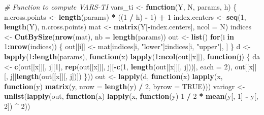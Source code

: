 \documentclass[11pt,]{article}
\newenvironment{Shaded}{\begin{snugshade}}{\end{snugshade}}
\newcommand{\CommentTok}[1]{\textcolor[rgb]{0.56,0.35,0.01}{\textit{#1}}}
\newcommand{\ControlFlowTok}[1]{\textcolor[rgb]{0.13,0.29,0.53}{\textbf{#1}}}
\newcommand{\DataTypeTok}[1]{\textcolor[rgb]{0.13,0.29,0.53}{#1}}
\newcommand{\DecValTok}[1]{\textcolor[rgb]{0.00,0.00,0.81}{#1}}
\newcommand{\KeywordTok}[1]{\textcolor[rgb]{0.13,0.29,0.53}{\textbf{#1}}}
\newcommand{\NormalTok}[1]{#1}
\newcommand{\OperatorTok}[1]{\textcolor[rgb]{0.81,0.36,0.00}{\textbf{#1}}}
\newcommand{\OtherTok}[1]{\textcolor[rgb]{0.56,0.35,0.01}{#1}}
\newcommand{\StringTok}[1]{\textcolor[rgb]{0.31,0.60,0.02}{#1}}
\begin{document}
\begin{Shaded}
\begin{Highlighting}[]
{{\CommentTok{# Function to compute VARS-TI}
\NormalTok{vars_ti <-}\StringTok{ }\ControlFlowTok{function}\NormalTok{(Y, N, params, h) \{}
\NormalTok{  n.cross.points <-}\StringTok{ }\KeywordTok{length}\NormalTok{(params) }\OperatorTok{*}\StringTok{ }\NormalTok{((}\DecValTok{1} \OperatorTok{/}\StringTok{ }\NormalTok{h) }\OperatorTok{-}\StringTok{ }\DecValTok{1}\NormalTok{) }\OperatorTok{+}\StringTok{ }\DecValTok{1}
\NormalTok{  index.centers <-}\StringTok{ }\KeywordTok{seq}\NormalTok{(}\DecValTok{1}\NormalTok{, }\KeywordTok{length}\NormalTok{(Y), n.cross.points)}
\NormalTok{  mat <-}\StringTok{ }\KeywordTok{matrix}\NormalTok{(Y[}\OperatorTok{-}\NormalTok{index.centers], }\DataTypeTok{ncol =}\NormalTok{ N)}
\NormalTok{  indices <-}\StringTok{ }\KeywordTok{CutBySize}\NormalTok{(}\KeywordTok{nrow}\NormalTok{(mat), }\DataTypeTok{nb =} \KeywordTok{length}\NormalTok{(params))}
\NormalTok{  out <-}\StringTok{ }\KeywordTok{list}\NormalTok{()}
  \ControlFlowTok{for}\NormalTok{(i }\ControlFlowTok{in} \DecValTok{1}\OperatorTok{:}\KeywordTok{nrow}\NormalTok{(indices)) \{}
\NormalTok{    out[[i]] <-}\StringTok{ }\NormalTok{mat[indices[i, }\StringTok{"lower"}\NormalTok{]}\OperatorTok{:}\NormalTok{indices[i, }\StringTok{"upper"}\NormalTok{], ]}
\NormalTok{  \}}
\NormalTok{  d <-}\StringTok{ }\KeywordTok{lapply}\NormalTok{(}\DecValTok{1}\OperatorTok{:}\KeywordTok{length}\NormalTok{(params), }\ControlFlowTok{function}\NormalTok{(x) }
    \KeywordTok{lapply}\NormalTok{(}\DecValTok{1}\OperatorTok{:}\KeywordTok{ncol}\NormalTok{(out[[x]]), }\ControlFlowTok{function}\NormalTok{(j) \{}
\NormalTok{      da <-}\StringTok{ }\KeywordTok{c}\NormalTok{(out[[x]][, j][}\DecValTok{1}\NormalTok{], }
              \KeywordTok{rep}\NormalTok{(out[[x]][, j][}\OperatorTok{-}\KeywordTok{c}\NormalTok{(}\DecValTok{1}\NormalTok{, }\KeywordTok{length}\NormalTok{(out[[x]][, j]))], }\DataTypeTok{each =} \DecValTok{2}\NormalTok{), }
\NormalTok{              out[[x]][, j][}\KeywordTok{length}\NormalTok{(out[[x]][, j])])}
\NormalTok{    \}))}
\NormalTok{  out <-}\StringTok{ }\KeywordTok{lapply}\NormalTok{(d, }\ControlFlowTok{function}\NormalTok{(x) }\KeywordTok{lapply}\NormalTok{(x, }\ControlFlowTok{function}\NormalTok{(y) }\KeywordTok{matrix}\NormalTok{(y, }\DataTypeTok{nrow =} \KeywordTok{length}\NormalTok{(y) }\OperatorTok{/}\StringTok{ }\DecValTok{2}\NormalTok{, }\DataTypeTok{byrow =} \OtherTok{TRUE}\NormalTok{)))}
\NormalTok{  variogr <-}\StringTok{ }\KeywordTok{unlist}\NormalTok{(}\KeywordTok{lapply}\NormalTok{(out, }\ControlFlowTok{function}\NormalTok{(x)}
    \KeywordTok{lapply}\NormalTok{(x, }\ControlFlowTok{function}\NormalTok{(y) }\DecValTok{1} \OperatorTok{/}\StringTok{ }\DecValTok{2} \OperatorTok{*}\StringTok{ }\KeywordTok{mean}\NormalTok{(y[, }\DecValTok{1}\NormalTok{] }\OperatorTok{-}\StringTok{ }\NormalTok{y[, }\DecValTok{2}\NormalTok{]) }\OperatorTok{^}\StringTok{ }\DecValTok{2}\NormalTok{)) }\OperatorTok{%>%}
}}}
\end{Highlighting}
\end{Shaded}
\end{document}
